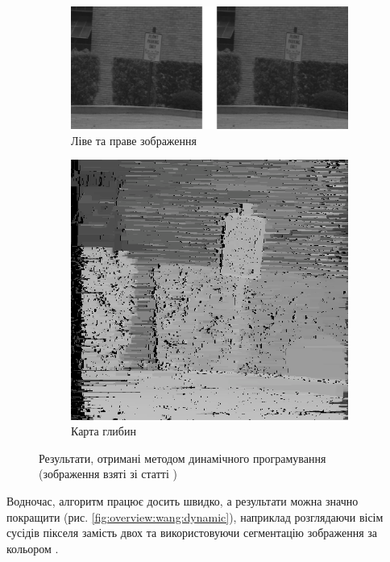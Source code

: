 \begin{figure}[h]
  \centering
  \begin{subfigure}[b]{0.8\textwidth}
      \includegraphics[width=\textwidth]{images/overview_cox_dynamic_left_right}
      \caption{Ліве та праве зображення}
  \end{subfigure}
  \begin{subfigure}[b]{0.4\textwidth}
      \includegraphics[width=\textwidth]{images/overview_cox_dynamic_result}
      \caption{Карта глибин}
  \end{subfigure}
  \caption{Результати, отримані методом динамічного програмування
           (зображення взяті зі статті \cite{overview:cox:dynamic})}
  \label{fig:overview:cox:dynamic}
\end{figure}

Водночас, алгоритм працює досить швидко,
а результати можна значно покращити (рис. \ref{fig:overview:wang:dynamic}),
наприклад розглядаючи вісім сусідів пікселя
замість двох та використовуючи сегментацію зображення за кольором
\cite{overview:wang:dynamic}.

